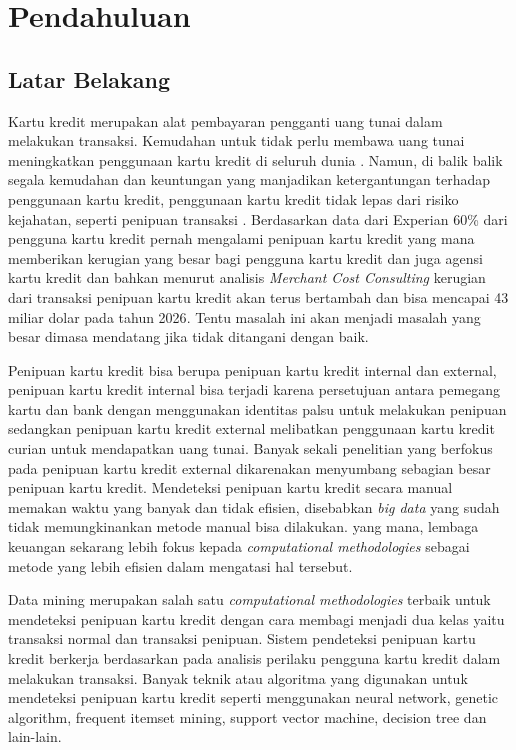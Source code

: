 \newpage
\chapter{Pendahuluan} \label{Bab I}

\section{Latar Belakang} \label{I.Latar Belakang}
Kartu kredit merupakan alat pembayaran pengganti uang tunai dalam melakukan transaksi. Kemudahan untuk tidak perlu membawa uang tunai meningkatkan penggunaan kartu kredit di seluruh dunia \cite{suryohadibroto1987surat}. Namun, di balik balik segala kemudahan dan keuntungan yang manjadikan ketergantungan terhadap penggunaan kartu kredit, penggunaan kartu kredit tidak lepas dari risiko kejahatan, seperti penipuan transaksi \cite{hendarsyah2020analisis}. Berdasarkan data dari Experian 60\% dari pengguna kartu kredit pernah mengalami penipuan kartu kredit yang mana memberikan kerugian yang besar bagi pengguna kartu kredit dan juga agensi kartu kredit \cite{experian_2024} dan bahkan menurut analisis \textit{Merchant Cost Consulting} kerugian dari transaksi penipuan kartu kredit akan terus bertambah dan bisa mencapai 43 miliar dolar pada tahun 2026\cite{merchantcostconsulting_2024}. Tentu masalah ini akan menjadi masalah yang besar dimasa mendatang jika tidak ditangani dengan baik.

Penipuan kartu kredit bisa berupa penipuan kartu kredit internal dan external, penipuan kartu kredit internal bisa terjadi karena persetujuan antara pemegang kartu dan bank dengan menggunakan identitas palsu untuk melakukan penipuan sedangkan penipuan kartu kredit external melibatkan penggunaan kartu kredit curian untuk mendapatkan uang tunai\cite{chaudhary2012review}. Banyak sekali penelitian yang berfokus pada penipuan kartu kredit external dikarenakan menyumbang sebagian besar penipuan kartu kredit\cite{chase_jpmorgan_fraud_management}. Mendeteksi penipuan kartu kredit secara manual memakan waktu yang banyak dan tidak efisien, disebabkan \textit{big data} yang sudah tidak memungkinankan metode manual bisa dilakukan. yang mana, lembaga keuangan sekarang lebih fokus kepada \textit{computational methodologies} sebagai metode yang lebih efisien dalam mengatasi hal tersebut\cite{west2016intelligent}.

Data mining merupakan salah satu \textit{computational methodologies} terbaik untuk mendeteksi penipuan kartu kredit dengan cara membagi menjadi dua kelas yaitu transaksi normal dan transaksi penipuan\cite{ngai2011application}. Sistem pendeteksi penipuan kartu kredit berkerja berdasarkan pada analisis perilaku pengguna kartu kredit dalam melakukan transaksi. Banyak teknik atau algoritma yang digunakan untuk mendeteksi penipuan kartu kredit seperti menggunakan neural network\cite{georgieva2019using}, genetic algorithm\cite{benchaji2019using}, frequent itemset mining\cite{seeja2014fraudminer}, support vector machine\cite{kumar2022credit}, decision tree\cite{gaikwad2014credit} dan lain-lain. 

